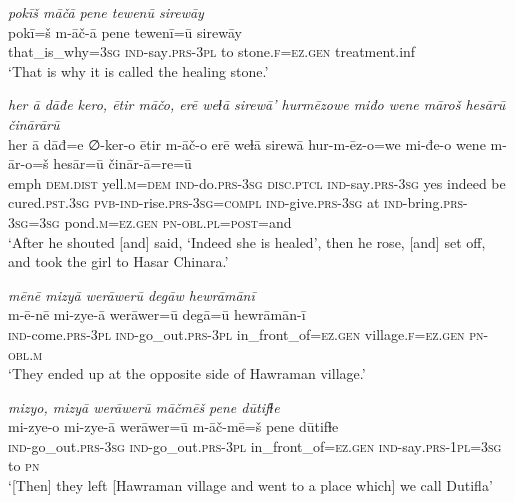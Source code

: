 \ea \label{ZP.59}
\textit{pokīš māčā pene tewenū sirewāy} \\ 
\gll pokī=š m-āč-ā pene tewenī=ū sirewāy \\ 
 that\_is\_why\textsc{=3sg} \textsc{ind-}say\textsc{.prs}\textsc{-3pl} to stone\textsc{.f}\textsc{\textsc{=ez.gen}} treatment.inf \\ 
\glt `That is why it is called the healing stone.'
\z 
 
\ea \label{ZP.61}
\textit{her ā dāđe kero, ētir māčo, erē weɫā sirewā’ hurmēzowe miđo wene māroš hesārū činārārū} \\ 
\gll her ā dāđ=e ∅-ker-o ētir m-āč-o erē weɫā sirewā hur-m-ēz-o=we mi-đe-o wene m-ār-o=š hesār=ū činār-ā=re=ū \\ 
 emph \textsc{dem.dist} yell\textsc{.m}\textsc{=dem} \textsc{ind-}do\textsc{.prs}\textsc{-3sg} \textsc{disc.ptcl} \textsc{ind-}say\textsc{.prs}\textsc{-3sg} yes indeed be cured\textsc{.pst}\textsc{.3sg} \textsc{pvb-}\textsc{ind-}rise\textsc{.prs}\textsc{-3sg}\textsc{=compl} \textsc{ind-}give\textsc{.prs}\textsc{-3sg} at \textsc{ind-}bring\textsc{.prs}\textsc{-3sg}\textsc{=3sg} pond\textsc{.m}\textsc{\textsc{=ez.gen}} \textsc{pn}\textsc{-obl}\textsc{.pl}\textsc{=\textsc{post}}=and \\ 
\glt `After he shouted [and] said, ‘Indeed she is healed’, then he rose, [and] set off, and took the girl to Hasar Chinara.'
\z 
 
\ea \label{ZP.62}
\textit{mēnē mizyā werāwerū degāw hewrāmānī} \\ 
\gll m-ē-nē mi-zye-ā werāwer=ū degā=ū hewrāmān-ī \\ 
 \textsc{ind-}come\textsc{.prs}\textsc{-3pl} \textsc{ind-}go\_out\textsc{.prs}\textsc{-3pl} in\_front\_of\textsc{\textsc{=ez.gen}} village\textsc{.f}\textsc{\textsc{=ez.gen}} \textsc{pn}\textsc{-obl}\textsc{.m} \\ 
\glt `They ended up at the opposite side of Hawraman village.'
\z 
 
\ea \label{ZP.63}
\textit{mizyo, mizyā werāwerū māčmēš pene dūtifɫe} \\ 
\gll mi-zye-o mi-zye-ā werāwer=ū m-āč-mē=š pene dūtifɫe \\ 
 \textsc{ind-}go\_out\textsc{.prs}\textsc{-3sg} \textsc{ind-}go\_out\textsc{.prs}\textsc{-3pl} in\_front\_of\textsc{\textsc{=ez.gen}} \textsc{ind-}say\textsc{.prs}\textsc{-1pl}\textsc{=3sg} to \textsc{pn} \\ 
\glt `[Then] they left [Hawraman village and went to a place which] we call Dutifla'
\z 
 
